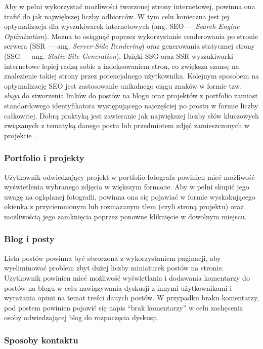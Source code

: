 \documentclass[a4paper, 12pt, twoside]{article}
\numberwithin{figure}{section}
\begin{document}
\begin{sloppypar}
Aby w pełni wykorzystać możliwości tworzonej strony internetowej, powinna ona trafić do jak największej liczby odbiorców. W tym celu konieczna jest jej optymalizacja dla wyszukiwarek internetowych (ang. SEO --- \textit{Search Engine Optimization}). Można to osiągnąć poprzez wykorzystanie renderowania po stronie serwera (SSR --- ang. \textit{Server-Side Rendering}) oraz generowania statycznej strony (SSG --- ang. \textit{Static Site Generation}). Dzięki SSG oraz SSR wyszukiwarki internetowe lepiej radzą sobie z indeksowaniem stron, co zwiększa szansę na znalezienie takiej strony przez potencjalnego użytkownika. Kolejnym sposobem na optymalizację SEO jest zastosowanie unikalnego ciągu znaków w formie tzw. \textit{sluga} do stworzenia linków do postów na blogu oraz projektów z portfolio zamiast standardowego identyfikatora występującego najczęściej po prostu w formie liczby całkowitej. Dobrą praktyką jest zawieranie jak największej liczby słów kluczowych związanych z tematyką danego postu lub przedmiotem zdjęć zamieszczonych w projekcie \cite{seo}.

\subsubsection*{Portfolio i projekty}

Użytkownik odwiedzający projekt w portfolio fotografa powinien mieć możliwość wyświetlenia wybranego zdjęcia w większym formacie. Aby w pełni skupić jego uwagę na oglądanej fotografii, powinna ona się pojawiać w formie wyskakującego okienka z przyciemnionym lub rozmazanym tłem (czyli stroną projektu) oraz możliwością jego zamknięcia poprzez ponowne kliknięcie w dowolnym miejscu. 

\subsubsection*{Blog i posty}

Lista postów powinna być stworzona z wykorzystaniem paginacji, aby wyeliminować problem zbyt dużej liczby miniaturek postów na stronie. Użytkownik powinien mieć możliwość wyświetlania i dodawania komentarzy do postów na blogu w celu nawiązywania dyskusji z innymi użytkownikami i wyrażania opinii na temat treści danych postów. W przypadku braku komentarzy, pod postem powinien pojawić się napis ``brak komentarzy'' w celu zachęcenia osoby odwiedzającej blog do rozpoczęcia dyskusji. 


\subsubsection*{Sposoby kontaktu}


\end{sloppypar}
\end{document}

